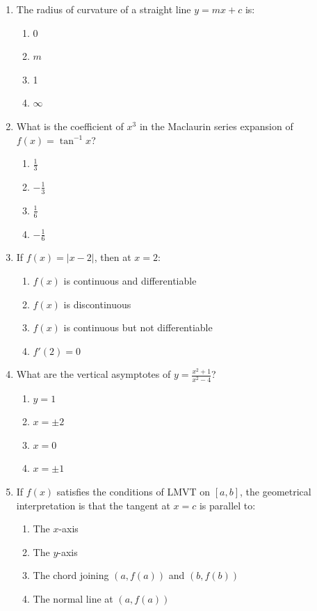 \begin{enumerate}[leftmargin=1.5em]
    \item The radius of curvature of a straight line $y = mx + c$ is:
    \begin{enumerate}[label=(\alph*)]
        \item 0
        \item $m$
        \item 1
        \item $\infty$
    \end{enumerate}

    \item What is the coefficient of $x^3$ in the Maclaurin series expansion of $f(x) = \tan^{-1}x$?
    \begin{enumerate}[label=(\alph*)]
        \item $\frac{1}{3}$
        \item $-\frac{1}{3}$
        \item $\frac{1}{6}$
        \item $-\frac{1}{6}$
    \end{enumerate}

    \item If $f(x) = |x-2|$, then at $x = 2$:
    \begin{enumerate}[label=(\alph*)]
        \item $f(x)$ is continuous and differentiable
        \item $f(x)$ is discontinuous
        \item $f(x)$ is continuous but not differentiable
        \item $f'(2) = 0$
    \end{enumerate}

    \item What are the vertical asymptotes of $y = \frac{x^2+1}{x^2-4}$?
    \begin{enumerate}[label=(\alph*)]
        \item $y = 1$
        \item $x = \pm 2$
        \item $x = 0$
        \item $x = \pm 1$
    \end{enumerate}

    \item If $f(x)$ satisfies the conditions of LMVT on $[a, b]$, the geometrical interpretation is that the tangent at $x=c$ is parallel to:
    \begin{enumerate}[label=(\alph*)]
        \item The $x$-axis
        \item The $y$-axis
        \item The chord joining $(a, f(a))$ and $(b, f(b))$
        \item The normal line at $(a, f(a))$
    \end{enumerate}


\end{enumerate}
